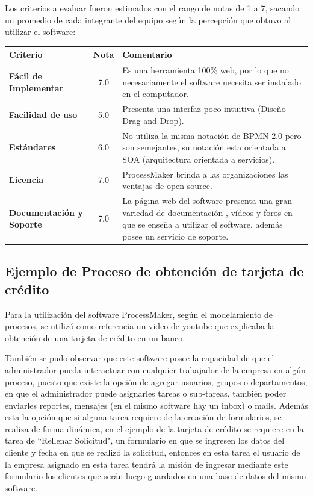 Los criterios a evaluar fueron estimados con el rango de notas de 1 a 7, sacando un promedio de cada integrante del equipo según la percepción que obtuvo al utilizar el software: \\

\begin{center}
\begin{tabular}{|l|c|p{2.40in}|}
 \hline
 \textbf{Criterio} & \textbf{Nota} & \textbf{Comentario} \\
 \hline
 \textbf{Fácil de Implementar} & 7.0 & Es una herramienta 100\% web, por lo que no necesariamente el software necesita ser instalado en el computador. \\
 \hline
 \textbf{Facilidad de uso} & 5.0 & Presenta una interfaz poco intuitiva (Diseño Drag and Drop). \\
 \hline
 \textbf{Estándares} & 6.0 & No utiliza la misma notación de BPMN 2.0 pero son semejantes, su notación esta orientada a SOA (arquitectura orientada a servicios). \\
 \hline
 \textbf{Licencia} & 7.0 & ProcessMaker brinda a las organizaciones las ventajas de open source. \\
 \hline
 \textbf{Documentación y Soporte} & 7.0 & La página web del software presenta una gran variedad de documentación , vídeos y foros en que se enseña a utilizar el software, además posee un servicio de soporte. \\
 \hline
\end{tabular}
\end{center}

\subsection{Ejemplo de Proceso de obtención de tarjeta de crédito}
Para la utilización del software ProcessMaker, según el modelamiento de procesos, se utilizó como referencia un video de youtube que explicaba la obtención de una tarjeta de crédito en un banco.

También se pudo observar que este software posee la capacidad de que el administrador pueda interactuar con cualquier trabajador de la empresa en algún proceso, puesto que existe la opción de agregar usuarios, grupos o departamentos, en que el administrador puede asignarles tareas o sub-tareas, también poder enviarles reportes, mensajes (en el mismo software hay un inbox) o mails. Además esta la opción que si alguna tarea requiere de la creación de formularios, se realiza de forma dinámica, en el ejemplo de la tarjeta de crédito se requiere en la tarea de ``Rellenar Solicitud", un formulario en que se ingresen los datos del cliente y fecha en que se realizó la solicitud, entonces en esta tarea el usuario de la empresa asignado en esta tarea tendrá la misión de ingresar mediante este formulario los clientes que serán luego guardados en una base de datos del mismo software.
 
